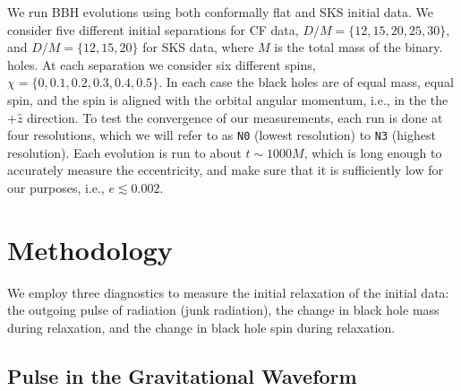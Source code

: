 We run BBH evolutions using both conformally flat and SKS initial
data.  We consider five different initial separations for CF data,
$D/M=\{12,15,20,25,30\}$, and $D/M=\{12,15,20\}$ for SKS data, where $M$ is the total mass of the binary.
holes. At each separation we consider  six different spins,
$\chi=\{0,0.1,0.2,0.3,0.4,0.5\}$. In each case the black holes are of
equal mass, equal spin, and the spin is aligned with the orbital
angular momentum, i.e., in the the $+\hat{z}$ direction. To test the
convergence of our measurements, each run is done at four
resolutions, which we will refer to as {\tt N0} (lowest resolution) to
{\tt N3}
(highest resolution). Each evolution is
run to about $t\sim1000M$, which is long enough to accurately measure the
eccentricity, and make sure that it is sufficiently low for our purposes, i.e.,
$e\lesssim 0.002$.

\section{Methodology}
\label{sec:Methodology}

We employ three diagnostics to measure the initial relaxation of
the initial data: the outgoing pulse of radiation (junk radiation),
the change in black hole mass during relaxation, and the change in
black hole spin during relaxation.



\subsection{Pulse in the Gravitational Waveform}

